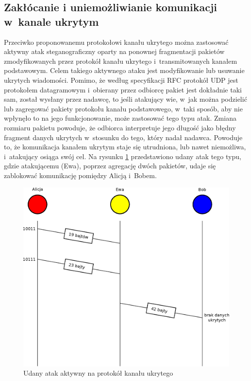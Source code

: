 \documentclass[a4paper, twoside, 12pt]{report}
\begin{document}
       \subsection{Zakłócanie i uniemożliwianie komunikacji w~kanale ukrytym}
       Przeciwko proponowanemu protokołowi kanału ukrytego można zastosować aktywny atak steganograficzny
       oparty na ponownej fragmentacji pakietów zmodyfikowanych przez protokół
       kanału ukrytego i~transmitowanych kanałem podstawowym. Celem takiego aktywnego
       ataku jest modyfikowanie lub usuwanie ukrytych wiadomości. Pomimo, że według
       specyfikacji RFC protokół UDP jest protokołem datagramowym i~obierany przez
       odbiorcę pakiet jest dokładnie taki sam, został wysłany przez
       nadawcę, to jeśli atakujący wie, w~jak można podzielić lub zagregować
       pakiety protokołu kanału podstawowego, w~taki sposób, aby nie wpłynęło to na
       jego funkcjonowanie, może zastosować tego typu atak. Zmiana rozmiaru pakietu
       powoduje, że odbiorca interpretuje jego długość jako błędny fragment danych
       ukrytych w~stosunku do tego, który nadał nadawca. Powoduje to, że komunikacja
       kanałem ukrytym staje się utrudniona, lub nawet niemożliwa, i~atakujący osiąga
       swój cel. Na rysunku \ref{UDANYATAKAKTYWNY} przedstawiono udany atak tego typu,
       gdzie atakującemu (Ewa), poprzez agregację dwóch pakietów,
       udaje się zablokować komunikację pomiędzy Alicją i~Bobem.
        \begin{figure}[h]
                \centering
                \includegraphics[scale=0.7]{udany_atak}
                \caption{Udany atak aktywny na protokół kanału ukrytego}
                \label{UDANYATAKAKTYWNY}
        \end{figure}
\end{document}
